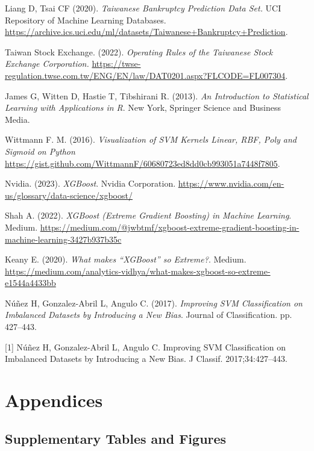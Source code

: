 \documentclass[12pt]{report}
\begin{document}
\begin{thebibliography}{9}

Liang D, Tsai CF (2020). \textit{Taiwanese Bankruptcy Prediction Data Set.}
UCI Repository of Machine Learning Databases. \url{https://archive.ics.uci.edu/ml/datasets/Taiwanese+Bankruptcy+Prediction}.

Taiwan Stock Exchange. (2022). \textit{Operating Rules of the Taiwanese Stock Exchange Corporation.}
\url{https://twse-regulation.twse.com.tw/ENG/EN/law/DAT0201.aspx?FLCODE=FL007304}.

James G, Witten D, Hastie T, Tibshirani R. (2013). \textit{An Introduction to Statistical Learning with Applications in R}. New York, Springer Science and Business Media.

Wittmann F. M. (2016). \textit{Visualization of SVM Kernels Linear, RBF, Poly and Sigmoid on Python} \url{https://gist.github.com/WittmannF/60680723ed8dd0cb993051a7448f7805}.

Nvidia. (2023). \textit{XGBoost}. Nvidia Corporation. \url{https://www.nvidia.com/en-us/glossary/data-science/xgboost/}

Shah A. (2022). \textit{XGBoost (Extreme Gradient Boosting) in Machine Learning}. Medium. \url{https://medium.com/@jwbtmf/xgboost-extreme-gradient-boosting-in-machine-learning-3427b937b35c} 

Keany E. (2020). \textit{What makes “XGBoost” so Extreme?}. Medium. \url{https://medium.com/analytics-vidhya/what-makes-xgboost-so-extreme-e1544a4433bb} 

Núñez H, Gonzalez-Abril L, Angulo C. (2017). \textit{Improving SVM Classification on Imbalanced Datasets by Introducing a New Bias}. Journal of Classification. pp. 427–443. 


[1]  Núñez H, Gonzalez-Abril L, Angulo C. Improving SVM Classification on Imbalanced Datasets by Introducing a New Bias. J Classif. 2017;34:427–443.


\end{thebibliography}

\chapter{Appendices}
\section{Supplementary Tables and Figures}
\end{document}
